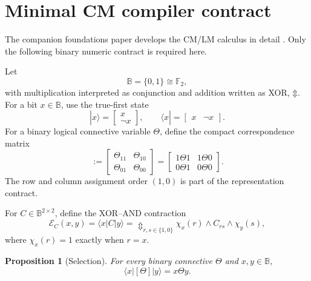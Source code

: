 \documentclass[10pt]{article}
\newcommand{\B}{\mathbb B}
\newcommand{\Ftwo}{\mathbb F_2}
\newcommand{\bxor}{\mathbin{\Updownarrow}}
\newcommand{\eval}{\mathcal E}
\theoremstyle{plain}
\newtheorem{proposition}{Proposition}
\theoremstyle{definition}
\theoremstyle{remark}
\begin{document}
\section{Minimal CM compiler contract}
\label{sec:minimal-contract}

The companion foundations paper develops the CM/LM calculus in detail \cite{TheoryFoundations2026}. Only the following binary numeric contract is required here.

Let
\begin{equation}
 \B=\{0,1\}\cong\Ftwo,
\end{equation}
with multiplication interpreted as conjunction and addition written as XOR, $\bxor$. For a bit $x\in\B$, use the true-first state
\begin{equation}
 |x\rangle=\begin{bmatrix}x\\ \neg x\end{bmatrix},
 \qquad
 \langle x|=\begin{bmatrix}x&\neg x\end{bmatrix}.
 \label{eq:state}
\end{equation}
For a binary logical connective variable $\Theta$, define the compact correspondence matrix
\begin{equation}
 [\Theta]
 :=
 \begin{bmatrix}
  \Theta_{11}&\Theta_{10}\\
  \Theta_{01}&\Theta_{00}
 \end{bmatrix}
 =
 \begin{bmatrix}
  1\Theta1&1\Theta0\\
  0\Theta1&0\Theta0
 \end{bmatrix}.
 \label{eq:cm}
\end{equation}
The row and column assignment order $(1,0)$ is part of the representation contract.

For $C\in\B^{2\times2}$, define the XOR--AND contraction
\begin{equation}
 \eval_C(x,y)=\langle x|C|y\rangle
 =\mathop{\bxor}_{r,s\in\{1,0\}}
 \chi_x(r)\wedge C_{rs}\wedge\chi_y(s),
 \label{eq:contraction}
\end{equation}
where $\chi_x(r)=1$ exactly when $r=x$.

\begin{proposition}[Selection]
For every binary connective $\Theta$ and $x,y\in\B$,
\begin{equation}
 \langle x|[\Theta]|y\rangle=x\Theta y.
 \label{eq:selection}
\end{equation}
\end{proposition}
\end{document}
